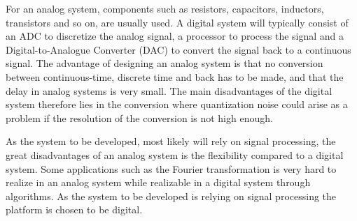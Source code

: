 For an analog system, components such as resistors, capacitors, inductors, transistors and so on, are usually used. A digital system will typically consist of an ADC to discretize the analog signal, a processor to process the signal and a Digital-to-Analogue Converter (DAC) to convert the signal back to a continuous signal. The advantage of designing an analog system is that no conversion between continuous-time, discrete time and back has to be made, and that the delay in analog systems is very small. The main disadvantages of the digital system therefore lies in the conversion where quantization noise could arise as a problem if the resolution of the conversion is not high enough. 

As the system to be developed, most likely will rely on signal processing, the great disadvantages of an analog system is the flexibility  compared to a digital system. Some applications such as the Fourier transformation is very hard to realize in an analog system while realizable in a digital system through algorithms. %
As the system to be developed is relying on signal processing the platform is chosen to be digital.




